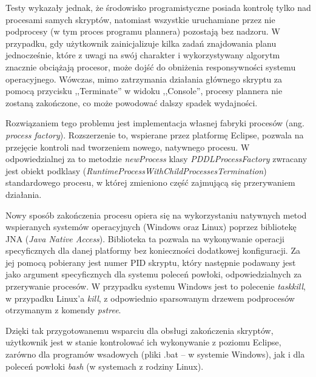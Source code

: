 Testy wykazały jednak, że środowisko programistyczne posiada kontrolę tylko nad procesami samych skryptów, natomiast wszystkie uruchamiane przez nie podprocesy (w tym proces programu plannera) pozostają bez nadzoru. W przypadku, gdy użytkownik zainicjalizuje kilka zadań znajdowania planu jednocześnie, które z uwagi na swój charakter i wykorzystywany algorytm znacznie obciążają procesor, może dojść do obniżenia responsywności systemu operacyjnego. Wówczas, mimo zatrzymania działania głównego skryptu za pomocą przycisku ,,Terminate'' w widoku ,,Console'', procesy plannera nie zostaną zakończone, co może powodować dalszy spadek wydajności.

Rozwiązaniem tego problemu jest implementacja własnej fabryki procesów (ang. \textit{process factory}). Rozszerzenie to, wspierane przez platformę Eclipse, pozwala na przejęcie kontroli nad tworzeniem nowego, natywnego procesu. W odpowiedzialnej za to metodzie \textit{newProcess} klasy \textit{PDDLProcessFactory} zwracany jest obiekt podklasy (\textit{RuntimeProcessWithChildProcessesTermination}) standardowego procesu, w której zmieniono część zajmującą się przerywaniem działania.

Nowy sposób zakończenia procesu opiera się na wykorzystaniu natywnych metod wspieranych systemów operacyjnych (Windows oraz Linux) poprzez bibliotekę JNA (\textit{Java Native Access}). Biblioteka ta pozwala na wykonywanie operacji specyficznych dla danej platformy bez konieczności dodatkowej konfiguracji. Za jej pomocą pobierany jest numer PID skryptu, który następnie podawany jest jako argument specyficznych dla systemu poleceń powłoki, odpowiedzialnych za przerywanie procesów. W przypadku systemu Windows jest to polecenie \textit{taskkill}, w przypadku Linux'a \textit{kill}, z odpowiednio sparsowanym drzewem podprocesów otrzymanym z komendy \textit{pstree}.

Dzięki tak przygotowanemu wsparciu dla obsługi zakończenia skryptów, użytkownik jest w stanie kontrolować ich wykonywanie z poziomu Eclipse, zarówno dla programów wsadowych (pliki .bat -- w systemie Windows), jak i dla poleceń powłoki \textit{bash} (w systemach z rodziny Linux).
